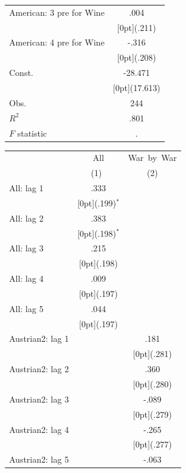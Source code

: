 \documentclass[12pt,a4paper,titlepage]{article}
\begin{document}
{\begin{tabular*}{\textwidth}{@{\extracolsep{\fill}}lc}
American: 3 pre for Wine &	.004 \\
&	\raisebox{.7ex}[0pt]{\scriptsize (.211)} \\
American: 4 pre for Wine &	-.316 \\
&	\raisebox{.7ex}[0pt]{\scriptsize (.208)} \\
Const. &	-28.471 \\
&	\raisebox{.7ex}[0pt]{\scriptsize (17.613)} \\
Obs. &	244 \\
$ R^2$ &	.801 \\
$ F$ statistic &	. \\
\hline\hline	
\end{tabular*}%


\newpage
{}
\begin{tabular*}{\textwidth}{@{\extracolsep{\fill}}lcc}		
	& \multicolumn{1}{c}{All} &	\multicolumn{1}{c}{War~by~War} \\
\cline{2-3}		
	& \multicolumn{1}{c}{(1)\mbox{\ }} &	\multicolumn{1}{c}{(2)} \\
\hline		
All: lag 1 &	.333 &	\\
&	\raisebox{.7ex}[0pt]{\scriptsize (.199)$^{*}$} &	\\
All: lag 2 &	.383 &	\\
&	\raisebox{.7ex}[0pt]{\scriptsize (.198)$^{*}$} &	\\
All: lag 3 &	.215 &	\\
&	\raisebox{.7ex}[0pt]{\scriptsize (.198)} &	\\
All: lag 4 &	.009 &	\\
&	\raisebox{.7ex}[0pt]{\scriptsize (.197)} &	\\
All: lag 5 &	.044 &	\\
&	\raisebox{.7ex}[0pt]{\scriptsize (.197)} &	\\
Austrian2: lag 1 &	&	.181 \\
&	&	\raisebox{.7ex}[0pt]{\scriptsize (.281)} \\
Austrian2: lag 2 &	&	.360 \\
&	&	\raisebox{.7ex}[0pt]{\scriptsize (.280)} \\
Austrian2: lag 3 &	&	-.089 \\
&	&	\raisebox{.7ex}[0pt]{\scriptsize (.279)} \\
Austrian2: lag 4 &	&	-.265 \\
&	&	\raisebox{.7ex}[0pt]{\scriptsize (.277)} \\
Austrian2: lag 5 &	&	-.063 \\

\end{tabular*}}
\end{document}
